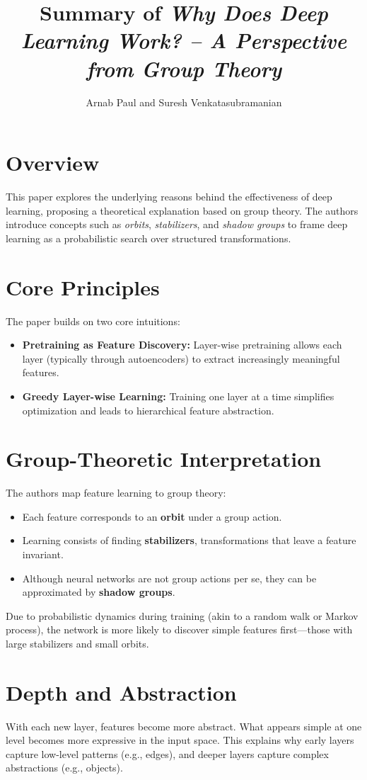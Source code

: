 \documentclass[12pt]{article}
\title{Summary of \textit{Why Does Deep Learning Work? – A Perspective from Group Theory}}
\author{Arnab Paul and Suresh Venkatasubramanian}
\date{}
\begin{document}
\maketitle

\section*{Overview}
This paper explores the underlying reasons behind the effectiveness of deep learning, proposing a theoretical explanation based on group theory. The authors introduce concepts such as \textit{orbits}, \textit{stabilizers}, and \textit{shadow groups} to frame deep learning as a probabilistic search over structured transformations.

\section*{Core Principles}
The paper builds on two core intuitions:
\begin{itemize}
    \item \textbf{Pretraining as Feature Discovery:} Layer-wise pretraining allows each layer (typically through autoencoders) to extract increasingly meaningful features.
    \item \textbf{Greedy Layer-wise Learning:} Training one layer at a time simplifies optimization and leads to hierarchical feature abstraction.
\end{itemize}

\section*{Group-Theoretic Interpretation}
The authors map feature learning to group theory:
\begin{itemize}
    \item Each feature corresponds to an \textbf{orbit} under a group action.
    \item Learning consists of finding \textbf{stabilizers}, transformations that leave a feature invariant.
    \item Although neural networks are not group actions per se, they can be approximated by \textbf{shadow groups}.
\end{itemize}
Due to probabilistic dynamics during training (akin to a random walk or Markov process), the network is more likely to discover simple features first—those with large stabilizers and small orbits.

\section*{Depth and Abstraction}
With each new layer, features become more abstract. What appears simple at one level becomes more expressive in the input space. This explains why early layers capture low-level patterns (e.g., edges), and deeper layers capture complex abstractions (e.g., objects).
\end{document}

